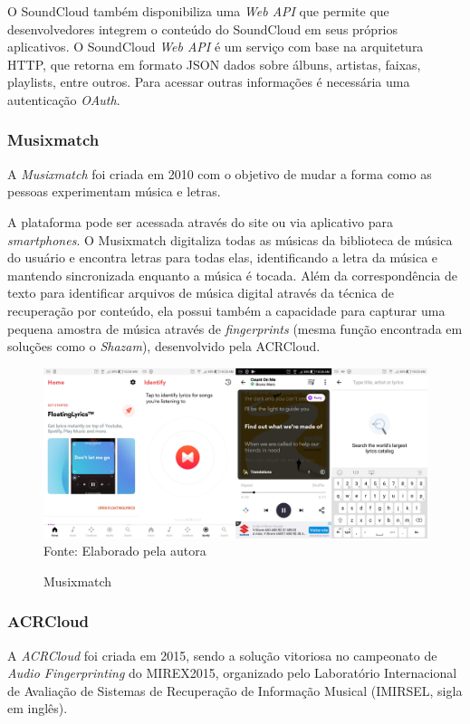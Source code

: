 O SoundCloud também disponibiliza uma \textit{Web API} que permite que desenvolvedores integrem o conteúdo do SoundCloud em seus próprios aplicativos. O SoundCloud \textit{Web API} é um serviço com base na arquitetura HTTP, que retorna em formato JSON dados sobre álbuns, artistas, faixas, playlists, entre outros. Para acessar outras informações é necessária uma autenticação \textit{OAuth}.

\subsubsection{Musixmatch} \label{subsec:musixmatch}
A \textit{Musixmatch} foi criada em 2010 com o objetivo de mudar a forma como as pessoas experimentam música e letras.

A plataforma pode ser acessada através do site ou via aplicativo para \textit{smartphones}. O Musixmatch digitaliza todas as músicas da biblioteca de música do usuário e encontra letras para todas elas, identificando a letra da música e mantendo sincronizada enquanto a música é tocada. Além da correspondência de texto para identificar arquivos de música digital através da técnica de recuperação por conteúdo, ela possui também a capacidade para capturar uma pequena amostra de música através de \textit{fingerprints} (mesma função encontrada em soluções como o \textit{Shazam}), desenvolvido pela ACRCloud.

\begin{figure}[!htb]
   \centering
   \caption{Musixmatch}\label{fig:musixmatch} 
   \includegraphics[scale=0.1]{figuras/musixmatch.jpg}
   \\Fonte: Elaborado pela autora
\end{figure}

\subsubsection{ACRCloud} \label{subsec:acrcloud} %
A \textit{ACRCloud} foi criada em 2015, sendo a solução vitoriosa no campeonato de \textit{Audio Fingerprinting} do MIREX2015, organizado pelo Laboratório Internacional de Avaliação de Sistemas de Recuperação de Informação Musical (IMIRSEL, sigla em inglês).

